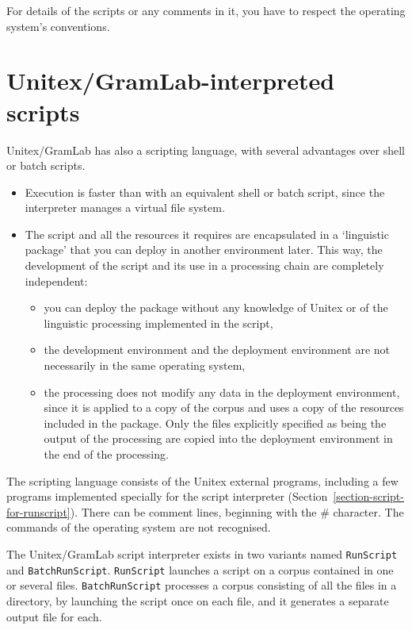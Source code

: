 \noindent For details of the scripts or any comments in it, you have to respect the operating system's
 conventions.



\section{Unitex/GramLab-interpreted scripts}
\label{section-unitex-scripts}

Unitex/GramLab has also a scripting language, with several advantages over shell or batch
scripts.
\begin{itemize}
    \item Execution is faster than with an equivalent shell or batch script, since the interpreter manages a
virtual file system.
    \item The script and all the resources it requires are encapsulated in a `linguistic package'
    that you can deploy in another environment later. This way, the development of the script and its
    use in a processing chain are completely independent:
\begin{itemize}
    \item you can deploy the package without any knowledge of Unitex or of the linguistic processing
    implemented in the script,
    \item the development environment and the deployment environment are not necessarily
    in the same operating system,
    \item the processing does not modify any data in the deployment environment, since it is applied
    to a copy of the corpus and uses a copy of the resources included in the package. Only the files
explicitly specified as being the output of the processing are copied into the deployment environment in the end 
of the processing.
\end{itemize}
\end{itemize}

\noindent The scripting language consists of the Unitex external programs, including
a few programs implemented specially for the script interpreter 
(Section~\ref{section-script-for-runscript}). There can be comment lines, beginning with 
the  \# character. The commands of the operating system are not recognised.

\bigskip{}
\noindent The Unitex/GramLab script interpreter exists in two variants named \verb$RunScript$ and
\verb$BatchRunScript$. \verb$RunScript$ launches a script on a corpus contained in one or several files.
\verb$BatchRunScript$ processes a corpus consisting of all the files in a directory,
by launching the script once on each file, and it generates a separate output file for each.




